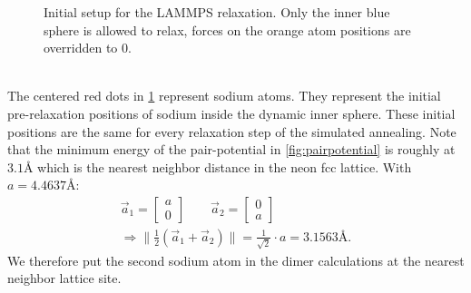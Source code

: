 \begin{figure}[h!]
	\caption{Initial setup for the \ac{LAMMPS} relaxation. Only the inner blue sphere is allowed to relax, forces on the orange atom positions are overridden to 0.}
	\label{fig:lammpssetup}
\end{figure}\\%
The centered red dots in \ref{fig:lammpssetup} represent sodium atoms. They represent the initial pre-relaxation positions of sodium inside the dynamic inner sphere. These initial positions are the same for every relaxation step of the simulated annealing. Note that the minimum energy of the pair-potential in \ref{fig:pairpotential} is roughly at $3\text{.}1\si{\angstrom}$ which is the nearest neighbor distance in the neon \ac{fcc} lattice. With $a = 4\text{.}4637\si{\angstrom}$: 
\begin{gather}
	\vec{a}_1=\begin{bmatrix}a\\0\end{bmatrix} \qquad \vec{a}_2=\begin{bmatrix}0\\a\end{bmatrix}\\
	\Rightarrow \|\frac{1}{2}\left(\vec{a}_1+\vec{a}_2\right)\|=\frac{1}{\sqrt{2}}\cdot a = 3\text{.}1563\si{\angstrom}.
\end{gather}  We therefore put the second sodium atom in the dimer calculations at the nearest neighbor lattice site. 
